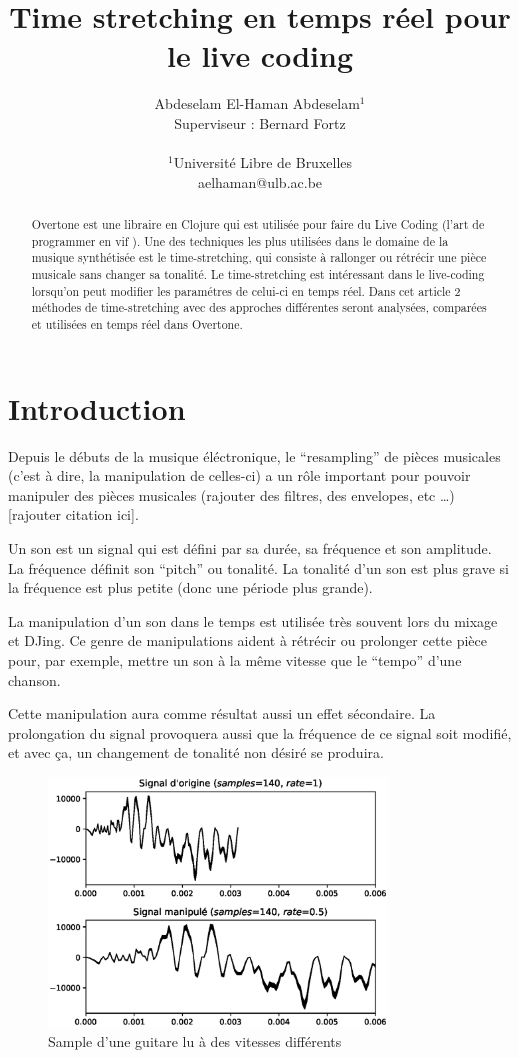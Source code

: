 \documentclass[letterpaper]{article}
\title{Time stretching en temps réel pour le live coding}
\author{Abdeselam El-Haman Abdeselam$^{1}$\\
Superviseur : Bernard Fortz
\mbox{}\\\\
$^1$Université Libre de Bruxelles \\
aelhaman@ulb.ac.be}
\begin{document}
\maketitle

\begin{abstract}
  Overtone est une libraire en Clojure qui est utilisée pour faire du
  Live Coding (l'art de programmer en \og vif \fg{}). Une des techniques les
  plus utilisées dans le domaine de la musique synthétisée est le
  time-stretching, qui consiste à rallonger ou rétrécir une pièce musicale
  sans changer sa tonalité. Le time-stretching est intéressant dans
  le live-coding lorsqu'on peut modifier les paramétres de celui-ci
  en temps réel. Dans cet article 2 méthodes de time-stretching avec des
  approches différentes seront analysées, comparées et utilisées en temps
  réel dans Overtone.

\end{abstract}

\section{Introduction}

  Depuis le débuts de la musique éléctronique, le ``resampling'' de pièces musicales
  (c'est à dire, la manipulation de celles-ci) a un rôle important pour pouvoir manipuler
  des pièces musicales (rajouter des filtres, des envelopes, etc \ldots ) [rajouter citation ici].

  Un son est un signal qui est défini par sa durée, sa fréquence et son amplitude. La fréquence
  définit son ``pitch'' ou tonalité. La tonalité d'un son est plus grave si la fréquence est plus
  petite (donc une période plus grande).
  
  La manipulation d'un son dans le temps est utilisée très souvent lors du mixage et DJing.
  Ce genre de manipulations aident à rétrécir ou prolonger cette pièce pour, par exemple, mettre
  un son à la même vitesse que le ``tempo'' d'une chanson.

  Cette manipulation aura comme résultat aussi un effet sécondaire. La prolongation du signal
  provoquera aussi que la fréquence de ce signal soit modifié, et avec ça, un changement
  de tonalité non désiré se produira.

  \begin{figure}[h]
    \centerline{\includegraphics[width=9cm]{res/fig1.eps}}
    \caption{\label{fig:guitar-stretch}Sample d'une guitare lu à des vitesses différents}
  \end{figure}
  
\end{document}
